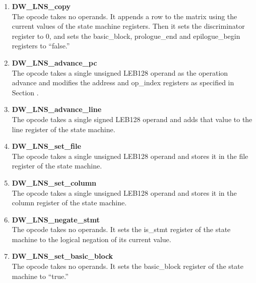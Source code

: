 \begin{enumerate}[1.]

\item \textbf{DW\-\_LNS\-\_copy} \\
The  opcode takes no operands. It appends a row
to the matrix using the current values of the state machine
registers. Then it sets the discriminator register to 0,
and sets the basic\_block, prologue\_end and epilogue\_begin
registers to ``false.''

\item \textbf{DW\-\_LNS\-\_advance\-\_pc} \\
The  opcode takes a single unsigned LEB128
operand as the operation advance and modifies the address
and op\_index registers as specified in 
Section .

\item \textbf{DW\-\_LNS\-\_advance\-\_line} \\
The  opcode takes a single signed LEB128
operand and adds that value to the line register of the
state machine.

\item \textbf{DW\-\_LNS\-\_set\-\_file} \\ 
The  opcode takes a single
unsigned LEB128 operand and stores it in the file register
of the state machine.

\item \textbf{DW\-\_LNS\-\_set\-\_column} \\ 
The  opcode takes a
single unsigned LEB128 operand and stores it in the column
register of the state machine.

\item \textbf{DW\-\_LNS\-\_negate\-\_stmt} \\
The  opcode takes no
operands. It sets the is\_stmt register of the state machine
to the logical negation of its current value.

\item \textbf{DW\-\_LNS\-\_set\-\_basic\-\_block} \\
The  opcode
takes no operands. It sets the basic\_block register of the
state machine to ``true.''




\end{enumerate}
